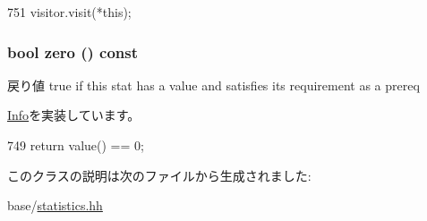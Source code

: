 \begin{DoxyCode}
751 { visitor.visit(*this); }
\end{DoxyCode}
\hypertarget{classStats_1_1ProxyInfo_a4e72b01b727d3165e75cba84eb507491}{
\subsubsection[{zero}]{\setlength{\rightskip}{0pt plus 5cm}bool zero () const}}
\label{classStats_1_1ProxyInfo_a4e72b01b727d3165e75cba84eb507491}
\begin{DoxyReturn}{戻り値}
true if this stat has a value and satisfies its requirement as a prereq 
\end{DoxyReturn}


\hyperlink{classStats_1_1Info_a3dfb6e014cb026189ed2317aba5700b2}{Info}を実装しています。


\begin{DoxyCode}
749 { return value() == 0; }
\end{DoxyCode}


このクラスの説明は次のファイルから生成されました:\begin{DoxyCompactItemize}
\item 
base/\hyperlink{statistics_8hh}{statistics.hh}\end{DoxyCompactItemize}
